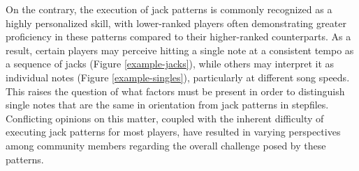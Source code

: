 \begin{center}
\begin{table}[ht]
\begin{minipage}{.5\linewidth}
			\medskip
			\vspace{52.5pt}
			\captionsetup{width=0.75\linewidth}
			\label{example-jumptrillable}
		\end{minipage}
	\end{table}
\end{center}

On the contrary, the execution of jack patterns is commonly recognized as a highly personalized skill, with lower-ranked players often demonstrating greater proficiency in these patterns compared to their higher-ranked counterparts. As a result, certain players may perceive hitting a single note at a consistent tempo as a sequence of jacks (Figure \ref{example-jacks}), while others may interpret it as individual notes (Figure \ref{example-singles}), particularly at different song speeds. This raises the question of what factors must be present in order to distinguish single notes that are the same in orientation from jack patterns in stepfiles. Conflicting opinions on this matter, coupled with the inherent difficulty of executing jack patterns for most players, have resulted in varying perspectives among community members regarding the overall challenge posed by these patterns.

